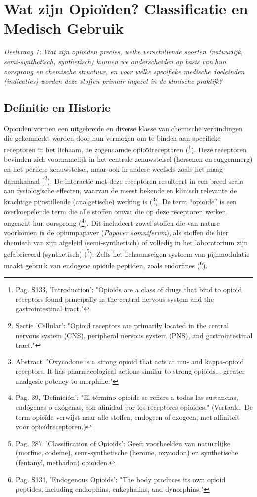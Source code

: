 \documentclass[11pt, a4paper]{report} %
\begin{document}
\chapter{Wat zijn Opioïden? Classificatie en Medisch Gebruik}
\label{ch:wat_zijn_opioiden}
\textit{Deelvraag 1: Wat zijn opioïden precies, welke verschillende soorten (natuurlijk, semi-synthetisch, synthetisch) kunnen we onderscheiden op basis van hun oorsprong en chemische structuur, en voor welke specifieke medische doeleinden (indicaties) worden deze stoffen primair ingezet in de klinische praktijk?}

\section{Definitie en Historie}
Opioïden vormen een uitgebreide en diverse klasse van chemische verbindingen die gekenmerkt worden door hun vermogen om te binden aan specifieke receptoren in het lichaam, de zogenaamde opioïdreceptoren (\cite{Trescot2008OpioidPharm}\footnote{Pag. S133, 'Introduction': "Opioids are a class of drugs that bind to opioid receptors found principally in the central nervous system and the gastrointestinal tract."}). Deze receptoren bevinden zich voornamelijk in het centrale zenuwstelsel (hersenen en ruggenmerg) en het perifere zenuwstelsel, maar ook in andere weefsels zoals het maag-darmkanaal (\cite{StatPearlsOpioidReceptor}\footnote{Sectie 'Cellular': "Opioid receptors are primarily located in the central nervous system (CNS), peripheral nervous system (PNS), and gastrointestinal tract."}). De interactie met deze receptoren resulteert in een breed scala aan fysiologische effecten, waarvan de meest bekende en klinisch relevante de krachtige pijnstillende (analgetische) werking is (\cite{Riley2008OxycodoneReview}\footnote{Abstract: "Oxycodone is a strong opioid that acts at mu- and kappa-opioid receptors. It has pharmacological actions similar to strong opioids... greater analgesic potency to morphine."}). De term \enquote{opioïde} is een overkoepelende term die alle stoffen omvat die op deze receptoren werken, ongeacht hun oorsprong (\cite{SciELO2020Opioids}\footnote{Pag. 39, 'Definición': "El término opioide se refiere a todas las sustancias, endógenas o exógenas, con afinidad por los receptores opioides." (Vertaald: De term opioïde verwijst naar alle stoffen, endogeen of exogeen, met affiniteit voor opioïdreceptoren.)}). Dit includeert zowel stoffen die van nature voorkomen in de opiumpapaver (\textit{Papaver somniferum}), als stoffen die hier chemisch van zijn afgeleid (semi-synthetisch) of volledig in het laboratorium zijn gefabriceerd (synthetisch) (\cite{Gupta2010ChemistryOpioids}\footnote{Pag. 287, 'Classification of Opioids': Geeft voorbeelden van natuurlijke (morfine, codeïne), semi-synthetische (heroïne, oxycodon) en synthetische (fentanyl, methadon) opioïden.}). Zelfs het lichaamseigen systeem van pijnmodulatie maakt gebruik van endogene opioïde peptiden, zoals endorfines (\cite{Trescot2008OpioidPharm}\footnote{Pag. S134, 'Endogenous Opioids': "The body produces its own opioid peptides, including endorphins, enkephalins, and dynorphins."}).
\end{document}
